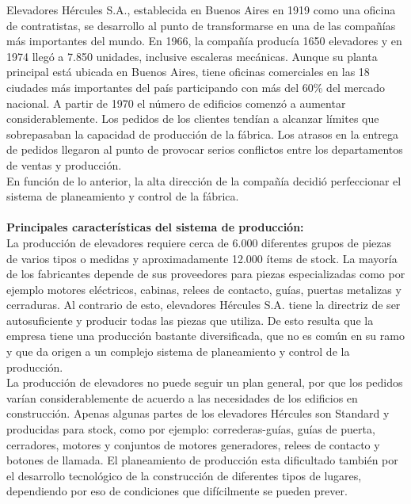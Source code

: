 \documentclass[a4paper,10pt,titlepage]{article}
\begin{document}
Elevadores H\'ercules S.A., establecida en Buenos Aires en 1919 como una oficina de
contratistas, se desarrollo al punto de transformarse en una de las compa\~n\'ias m\'as
importantes del mundo. En 1966, la compa\~n\'ia produc\'ia 1650 elevadores y en 1974
lleg\'o a 7.850 unidades, inclusive escaleras mec\'anicas. Aunque su planta principal est\'a
ubicada en Buenos Aires, tiene oficinas comerciales en las 18 ciudades m\'as
importantes del pa\'is participando con m\'as del 60\% del mercado nacional. A partir de
1970 el n\'umero de edificios comenz\'o a aumentar considerablemente. Los pedidos de
los clientes tend\'ian a alcanzar l\'imites que sobrepasaban la capacidad de producci\'on
de la f\'abrica. Los atrasos en la entrega de pedidos llegaron al punto de provocar serios
conflictos entre los departamentos de ventas y producci\'on.\\
En funci\'on de lo anterior, la alta direcci\'on de la compa\~n\'ia decidi\'o perfeccionar el
sistema de planeamiento y control de la f\'abrica.\\ \\
\textbf{Principales caracter\'isticas del sistema de producci\'on:}\\
La producci\'on de elevadores requiere cerca de 6.000 diferentes grupos de piezas de
varios tipos o medidas y aproximadamente 12.000 \'items de stock. La mayor\'ia de los
fabricantes depende de sus proveedores para piezas especializadas como por ejemplo
motores el\'ectricos, cabinas, relees de contacto, gu\'ias, puertas metalizas y cerraduras.
Al contrario de esto, elevadores H\'ercules S.A. tiene la directriz de ser autosuficiente y
producir todas las piezas que utiliza. De esto resulta que la empresa tiene una
producci\'on bastante diversificada, que no es com\'un en su ramo y que da origen a un
complejo sistema de planeamiento y control de la producci\'on.\\
La producci\'on de elevadores no puede seguir un plan general, por que los pedidos
var\'ian considerablemente de acuerdo a las necesidades de los edificios en
construcci\'on. Apenas algunas partes de los elevadores H\'ercules son Standard y
producidas para stock, como por ejemplo: correderas-gu\'ias, gu\'ias de puerta,
cerradores, motores y conjuntos de motores generadores, relees de contacto y botones
de llamada. El planeamiento de producci\'on esta dificultado tambi\'en por el desarrollo
tecnol\'ogico de la construcci\'on de diferentes tipos de lugares, dependiendo por eso de
condiciones que dif\'icilmente se pueden prever.\\
\end{document}

